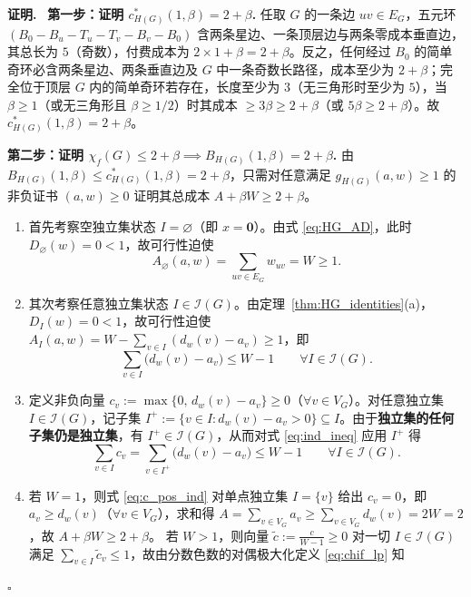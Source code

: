 \documentclass[11pt,a4paper]{ctexart}
\theoremstyle{definition}
\newenvironment{proofcn}{\par\noindent\textbf{证明.}\ }{\hfill$\square$\par}
\newcommand{\Ind}{\mathcal I}
\newcommand{\1}{\boldsymbol 1}
\newcommand{\0}{\boldsymbol 0}
\newcommand{\chif}{\chi_f}
\begin{document}
\begin{proofcn}
\textbf{第一步：证明 $c_{H(G)}^*(1,\beta)=2+\beta$.}
任取 $G$ 的一条边 $uv\in E_G$，五元环 $(B_0-B_u-T_u-T_v-B_v-B_0)$ 含两条星边、一条顶层边与两条零成本垂直边，其总长为 $5$（奇数），付费成本为 $2\times 1+\beta=2+\beta$。反之，任何经过 $B_0$ 的简单奇环必含两条星边、两条垂直边及 $G$ 中一条奇数长路径，成本至少为 $2+\beta$；完全位于顶层 $G$ 内的简单奇环若存在，长度至少为 $3$（无三角形时至少为 $5$），当 $\beta\ge 1$（或无三角形且 $\beta\ge 1/2$）时其成本 $\ge 3\beta\ge 2+\beta$（或 $5\beta\ge 2+\beta$）。故 $c_{H(G)}^*(1,\beta)=2+\beta$。

\medskip
\noindent\textbf{第二步：证明 $\chif(G)\le 2+\beta \implies B_{H(G)}(1,\beta)=2+\beta$.}
由 $B_{H(G)}(1,\beta)\le c_{H(G)}^*(1,\beta)=2+\beta$，只需对任意满足 $g_{H(G)}(a,w)\ge 1$ 的非负证书 $(a,w)\ge 0$ 证明其总成本 $A+\beta W\ge 2+\beta$。
\begin{enumerate}[label=(\roman*)]
\item 首先考察空独立集状态 $I=\varnothing$（即 $x=\0$）。由式 \eqref{eq:HG_AD}，此时 $D_\varnothing(w)=0<1$，故可行性迫使
\begin{equation}\label{eq:W_ge_1}
 A_\varnothing(a,w)=\sum_{uv\in E_G}w_{uv}=W\ge 1.
\end{equation}
\item 其次考察任意独立集状态 $I\in\Ind(G)$。由定理~\ref{thm:HG_identities}(a)，$D_I(w)=0<1$，故可行性迫使 $A_I(a,w)=W-\sum_{v\in I}(d_w(v)-a_v)\ge 1$，即
\begin{equation}\label{eq:ind_ineq}
 \sum_{v\in I}\bigl(d_w(v)-a_v\bigr)\le W-1\qquad \forall I\in\Ind(G).
\end{equation}
\item 定义非负向量 $c_v:=\max\{0,\,d_w(v)-a_v\}\ge 0$（$\forall v\in V_G$）。对任意独立集 $I\in\Ind(G)$，记子集 $I^+:=\{v\in I:d_w(v)-a_v>0\}\subseteq I$。由于\textbf{独立集的任何子集仍是独立集}，有 $I^+\in\Ind(G)$，从而对式 \eqref{eq:ind_ineq} 应用 $I^+$ 得
\begin{equation}\label{eq:c_pos_ind}
 \sum_{v\in I}c_v = \sum_{v\in I^+}\bigl(d_w(v)-a_v\bigr) \le W-1\qquad \forall I\in\Ind(G).
\end{equation}
\item 若 $W=1$，则式 \eqref{eq:c_pos_ind} 对单点独立集 $I=\{v\}$ 给出 $c_v=0$，即 $a_v\ge d_w(v)$（$\forall v\in V_G$），求和得 $A=\sum_{v\in V_G}a_v\ge \sum_{v\in V_G}d_w(v)=2W=2$，故 $A+\beta W\ge 2+\beta$。
若 $W>1$，则向量 $\tilde c:=\frac{c}{W-1}\ge 0$ 对一切 $I\in\Ind(G)$ 满足 $\sum_{v\in I}\tilde c_v\le 1$，故由分数色数的对偶极大化定义 \eqref{eq:chif_lp} 知

\end{enumerate}
\end{proofcn}
\end{document}
